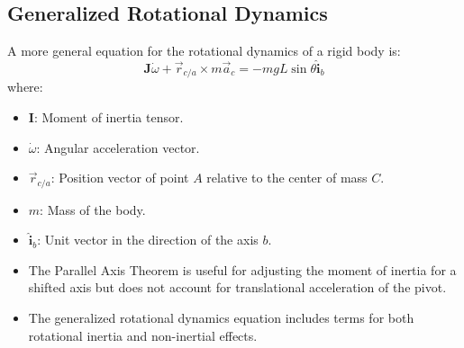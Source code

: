 \subsection{Generalized Rotational Dynamics}
A more general equation for the rotational dynamics of a rigid body is:
\[
\mathbf{J} \dot{\omega} + \vec{r}_{c/a} \times m \vec{a}_c = -mgL \sin \theta \hat{\mathbf{i}}_b
\]
where:
\begin{itemize}
    \item \( \mathbf{I} \): Moment of inertia tensor.
    \item \( \dot{\omega} \): Angular acceleration vector.
    \item \( \vec{r}_{c/a} \): Position vector of point \( A \) relative to the center of mass \( C \).
    \item \( m \): Mass of the body.
    \item \( \hat{\mathbf{i}}_b \): Unit vector in the direction of the axis \( b \).
\end{itemize}

\begin{itemize}
    \item The Parallel Axis Theorem is useful for adjusting the moment of inertia for a shifted axis but does not account for translational acceleration of the pivot.
    \item The generalized rotational dynamics equation includes terms for both rotational inertia and non-inertial effects.
\end{itemize}



